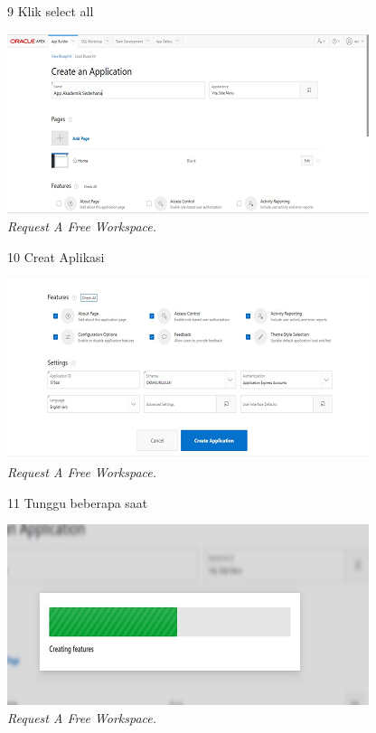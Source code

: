\begin{enumerate}
\begin{figure}[!htbp]
\item[9]Klik  select all
    \begin{center}
    \includegraphics[scale=0.5]{figures/9.png}
    \caption{\textit{Request A Free Workspace.}}
    \end{center}
    \end{figure}
    
\begin{figure}[!htbp]
\item[10]Creat Aplikasi

    \begin{center}
    \includegraphics[scale=0.5]{figures/10 .png}
    \caption{\textit{Request A Free Workspace.}}
    \end{center}
    \end{figure}

\begin{figure}[!htbp]
\item[11]Tunggu beberapa saat

    \begin{center}
    \includegraphics[scale=0.5]{figures/11.png}
    \caption{\textit{Request A Free Workspace.}}
    \end{center}
    \end{figure}


\end{enumerate}
